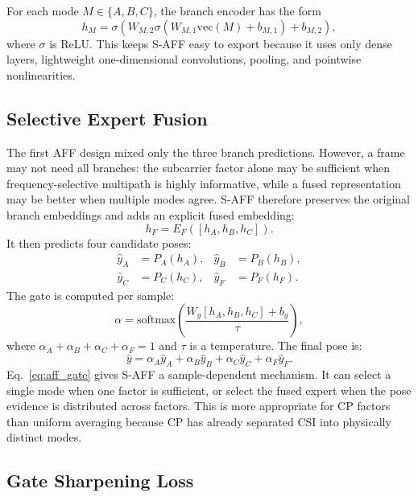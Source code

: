 \documentclass[10pt,conference]{IEEEtran}
\begin{document}
For each mode $M\in\{A,B,C\}$, the branch encoder has the form
\begin{equation}
h_M=\sigma(W_{M,2}\sigma(W_{M,1}\mathrm{vec}(M)+b_{M,1})+b_{M,2}),
\end{equation}
where $\sigma$ is ReLU. This keeps S-AFF easy to export because it uses only dense layers, lightweight one-dimensional convolutions, pooling, and pointwise nonlinearities.

\subsection{Selective Expert Fusion}

The first AFF design mixed only the three branch predictions. However, a frame may not need all branches: the subcarrier factor alone may be sufficient when frequency-selective multipath is highly informative, while a fused representation may be better when multiple modes agree. S-AFF therefore preserves the original branch embeddings and adds an explicit fused embedding:
\begin{equation}
h_F=E_F([h_A,h_B,h_C]).
\end{equation}
It then predicts four candidate poses:
\begin{align}
\hat{y}_A &= P_A(h_A),&
\hat{y}_B &= P_B(h_B),\\
\hat{y}_C &= P_C(h_C),&
\hat{y}_F &= P_F(h_F).
\end{align}
The gate is computed per sample:
\begin{equation}
\alpha=\mathrm{softmax}\left(\frac{W_g[h_A,h_B,h_C]+b_g}{\tau}\right),
\label{eq:aff_gate}
\end{equation}
where $\alpha_A+\alpha_B+\alpha_C+\alpha_F=1$ and $\tau$ is a temperature. The final pose is:
\begin{equation}
\hat{y}=
\alpha_A \hat{y}_A+
\alpha_B \hat{y}_B+
\alpha_C \hat{y}_C+
\alpha_F \hat{y}_F.
\label{eq:aff_pose}
\end{equation}
Eq.~\ref{eq:aff_gate} gives S-AFF a sample-dependent mechanism. It can select a single mode when one factor is sufficient, or select the fused expert when the pose evidence is distributed across factors. This is more appropriate for CP factors than uniform averaging because CP has already separated CSI into physically distinct modes.

\subsection{Gate Sharpening Loss}
\end{document}

